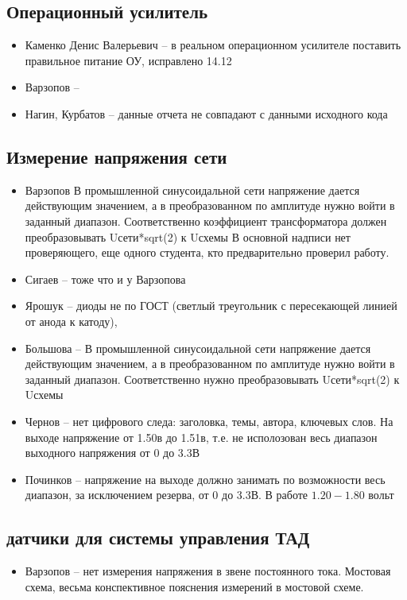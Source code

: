 \subsection*{Операционный усилитель}
\begin{itemize}
\item Каменко Денис Валерьевич -- в реальном операционном усилителе поставить правильное питание ОУ, исправлено 14.12
\item Варзопов --
\item Нагин, Курбатов -- данные отчета не совпадают с данными исходного кода
\end{itemize}

\subsection*{Измерение напряжения сети}
\begin{itemize}
\item Варзопов В промышленной синусоидальной сети напряжение дается действующим значением,
а в преобразованном по амплитуде нужно войти в заданный диапазон. Соответственно коэффициент трансформатора должен преобразовывать Uсети*sqrt(2) к Uсхемы 
В основной надписи нет проверяющего, еще одного студента, кто предварительно проверил работу. 
\item Сигаев -- тоже что и у Варзопова
\item Ярошук -- диоды не по ГОСТ (светлый треугольник с пересекающей линией от анода к катоду),
\item  Большова -- В промышленной синусоидальной сети напряжение дается действующим значением,
а в преобразованном по амплитуде нужно войти в заданный диапазон. Соответственно нужно преобразовывать Uсети*sqrt(2) к Uсхемы
\item Чернов -- нет цифрового следа: заголовка, темы, автора, ключевых слов. На выходе напряжение от 1.50в до 1.51в, т.е. не исполозован весь диапазон выходного напряжения от 0 до 3.3В
\item Починков -- напряжение на выходе должно занимать по возможности весь диапазон, за исключением резерва, от 0 до 3.3В. В работе $1.20-1.80$ вольт
\end{itemize}

\subsection*{датчики для системы управления ТАД}
\begin{itemize}
\item Варзопов -- нет измерения напряжения в звене постоянного тока. Мостовая схема, весьма конспективное пояснения измерений в мостовой схеме.
\end{itemize}


